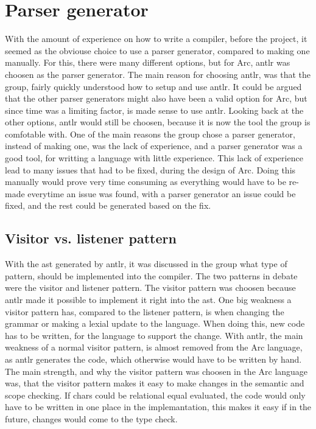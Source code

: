 \section{Parser generator}
With the amount of experience on how to write a compiler, before the project, it seemed as the obviouse choice to use a parser generator, compared to making one manually. For this, there were many different options, but for Arc, \gls{antlr} was choosen as the parser generator. The main reason for choosing \gls{antlr}, was that the group, fairly quickly understood how to setup and use \gls{antlr}. It could be argued that the other parser generators might also have been a valid option for Arc, but since time was a limiting factor, is made sense to use \gls{antlr}. Looking back at the other options, \gls{antlr} would still be choosen, because it is now the tool the group is comfotable with. One of the main reasons the group chose a parser generator, instead of making one, was the lack of experience, and a parser generator was a good tool, for writting a language with little experience. This lack of experience lead to many issues that had to be fixed, during the design of Arc. Doing this manually would prove very time consuming as everything would have to be re-made everytime an issue was found, with a parser generator an issue could be fixed, and the rest could be generated based on the fix.

\subsection{Visitor vs. listener pattern}
With the \gls{ast} generated by \gls{antlr}, it was discussed in the group what type of pattern, should be implemented into the compiler. The two patterns in debate were the visitor and listener pattern. The visitor pattern was choosen because \gls{antlr} made it possible to implement it right into the \gls{ast}. One big weakness a visitor pattern has, compared to the listener pattern, is when changing the grammar or making a lexial update to the language. When doing this, new code has to be written, for the language to support the change. With \gls{antlr}, the main weakness of a normal visitor pattern, is almost removed from the Arc language, as \gls{antlr} generates the code, which otherwise would have to be written by hand. The main strength, and why the visitor pattern was choosen in the Arc language was, that the visitor pattern makes it easy to make changes in the semantic and scope checking. If chars could be relational equal evaluated, the code would only have to be written in one place in the implemantation, this makes it easy if in the future, changes would come to the type check. 


